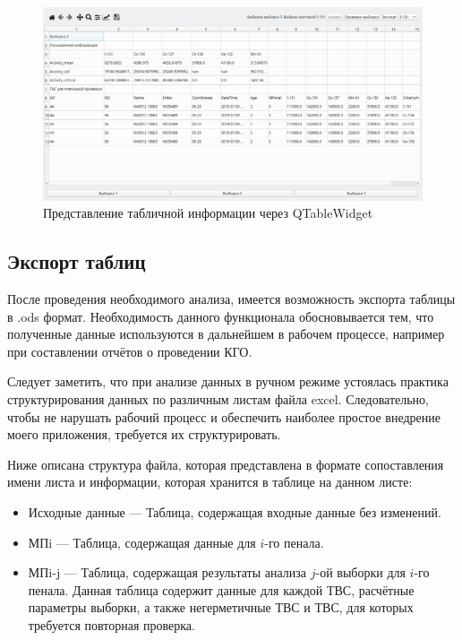 \begin{figure}[H]
	\centering
	\includegraphics[width=1\linewidth]{pics/ris14} %
	\caption{Представление табличной информации через QTableWidget}
	\label{fig:ris14} %
\end{figure}

\subsection{Экспорт таблиц}

После проведения необходимого анализа, имеется возможность экспорта таблицы в .ods формат. Необходимость данного функционала обосновывается тем, что полученные данные используются в дальнейшем в рабочем процессе, например при составлении отчётов о проведении КГО. 

Следует заметить, что при анализе данных в ручном режиме устоялась практика структурирования данных по различным листам файла excel. Следовательно, чтобы не нарушать рабочий процесс и обеспечить наиболее простое внедрение моего приложения, требуется их структурировать. 

Ниже описана структура файла, которая представлена в формате сопоставления имени листа и информации, которая хранится в таблице на данном листе:

\begin{itemize}
	\item Исходные данные --- Таблица, содержащая входные данные без изменений.
	\item МПi --- Таблица, содержащая данные для $i$-го пенала.
	\item МПi-j --- Таблица, содержащая результаты анализа $j$-ой выборки для $i$-го пенала. Данная таблица содержит данные для каждой ТВС, расчётные параметры выборки, а также негерметичные ТВС и ТВС, для которых требуется повторная проверка.
\end{itemize}

